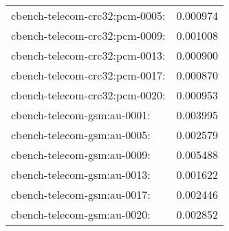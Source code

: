 \begin{longtable}{lr}
cbench-telecom-crc32:pcm-0005: & 0.000974 \\
cbench-telecom-crc32:pcm-0009: & 0.001008 \\
cbench-telecom-crc32:pcm-0013: & 0.000900 \\
cbench-telecom-crc32:pcm-0017: & 0.000870 \\
cbench-telecom-crc32:pcm-0020: & 0.000953 \\
cbench-telecom-gsm:au-0001: & 0.003995 \\
cbench-telecom-gsm:au-0005: & 0.002579 \\
cbench-telecom-gsm:au-0009: & 0.005488 \\
cbench-telecom-gsm:au-0013: & 0.001622 \\
cbench-telecom-gsm:au-0017: & 0.002446 \\
cbench-telecom-gsm:au-0020: & 0.002852 \\
\end{longtable}
